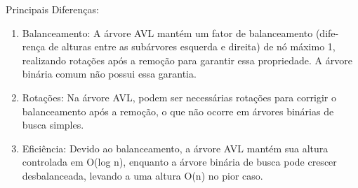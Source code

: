 \documentclass{article}
\begin{document}
Principais Diferenças:
  \begin{enumerate}[label=\alph*)]
    \item Balanceamento: A árvore AVL mantém um fator de balanceamento (dife-rença de alturas entre as subárvores esquerda e direita) de nó máximo 1, realizando rotações após a remoção para garantir essa propriedade. A árvore binária comum não possui essa garantia.
    \item Rotações: Na árvore AVL, podem ser necessárias rotações para corrigir o balanceamento após a remoção, o que não ocorre em árvores binárias de busca simples.
    \item Eficiência: Devido ao balanceamento, a árvore AVL mantém sua altura controlada em O(log n), enquanto a árvore binária de busca pode crescer desbalanceada, levando a uma altura O(n) no pior caso.
  \end{enumerate}
\end{document}

